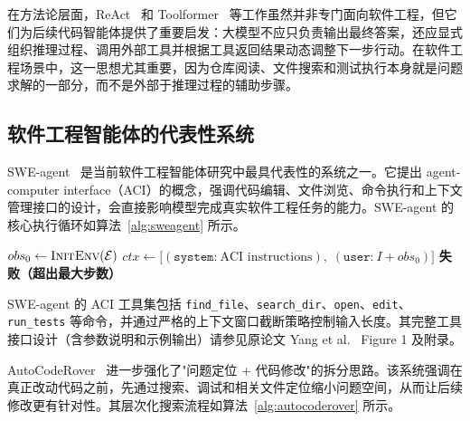 在方法论层面，ReAct~\cite{yao2022react} 和 Toolformer~\cite{schick2023toolformer} 等工作虽然并非专门面向软件工程，但它们为后续代码智能体提供了重要启发：大模型不应只负责输出最终答案，还应显式组织推理过程、调用外部工具并根据工具返回结果动态调整下一步行动。在软件工程场景中，这一思想尤其重要，因为仓库阅读、文件搜索和测试执行本身就是问题求解的一部分，而不是外部于推理过程的辅助步骤。

\subsection{软件工程智能体的代表性系统}

SWE-agent~\cite{yang2024sweagent} 是当前软件工程智能体研究中最具代表性的系统之一。它提出 agent-computer interface（ACI）的概念，强调代码编辑、文件浏览、命令执行和上下文管理接口的设计，会直接影响模型完成真实软件工程任务的能力。SWE-agent 的核心执行循环如算法~\ref{alg:sweagent} 所示。

\begin{algorithm}[H]
\caption{SWE-agent: ACI 执行循环}
\label{alg:sweagent}
$obs_0 \leftarrow \textsc{InitEnv}(\mathcal{E})$
$ctx \leftarrow \bigl[(\texttt{system:}\ \text{ACI instructions}),\;(\texttt{user:}\ I + obs_0)\bigr]$\;
\Return \textbf{失败（超出最大步数）}\;
\end{algorithm}

SWE-agent 的 ACI 工具集包括 \texttt{find\_file}、\texttt{search\_dir}、\texttt{open}、\texttt{edit}、\texttt{run\_tests} 等命令，并通过严格的上下文窗口截断策略控制输入长度。其完整工具接口设计（含参数说明和示例输出）请参见原论文 Yang et al.~\cite{yang2024sweagent} Figure 1 及附录。

AutoCodeRover~\cite{zhang2024autocoderover} 进一步强化了"问题定位 + 代码修改"的拆分思路。该系统强调在真正改动代码之前，先通过搜索、调试和相关文件定位缩小问题空间，从而让后续修改更有针对性。其层次化搜索流程如算法~\ref{alg:autocoderover} 所示。


